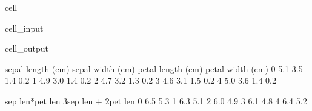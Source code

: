 \documentclass[letterpaper,10pt,english]{jupyterBook}
\begin{document}
\begin{sphinxuseclass}{cell}\begin{sphinxVerbatimInput}

\begin{sphinxuseclass}{cell_input}
\begin{sphinxVerbatim}[commandchars=\\\{\}]
  
\PYG{p}{[}\PYG{p}{]}  \PYG{p}{[}\PYG{p}{]}  \PYG{p}{[}\PYG{p}{]}
\PYG{p}{[}\PYG{p}{]}  \PYG{p}{[}\PYG{p}{]}  \PYG{p}{[}\PYG{p}{]}
\end{sphinxVerbatim}

\end{sphinxuseclass}\end{sphinxVerbatimInput}
\begin{sphinxVerbatimOutput}

\begin{sphinxuseclass}{cell_output}
\begin{sphinxVerbatim}[commandchars=\\\{\}]
   sepal length (cm)  sepal width (cm)  petal length (cm)  petal width (cm)  \PYGZbs{}
0                5.1               3.5                1.4               0.2   
1                4.9               3.0                1.4               0.2   
2                4.7               3.2                1.3               0.2   
3                4.6               3.1                1.5               0.2   
4                5.0               3.6                1.4               0.2   

   sep len*pet len  3sep len + 2pet len  
0              6.5                  5.3  
1              6.3                  5.1  
2              6.0                  4.9  
3              6.1                  4.8  
4              6.4                  5.2  
\end{sphinxVerbatim}

\end{sphinxuseclass}\end{sphinxVerbatimOutput}

\end{sphinxuseclass}
\end{document}
